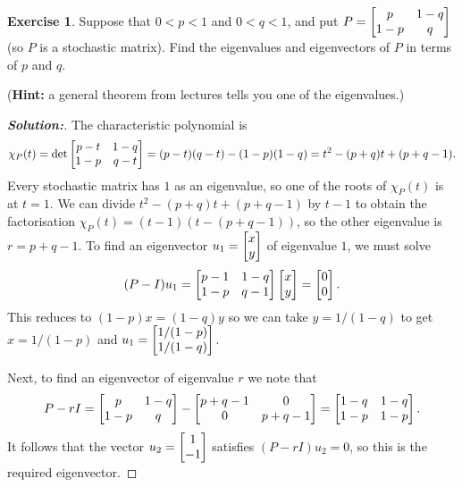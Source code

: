 \documentclass[a4paper]{amsart}
\theoremstyle{definition}
\newtheorem{exercise}{Exercise}
\newenvironment{solution}{\begin{proof}[\textbf{Solution:}] \vphantom{u}}{\end{proof}}
\begin{document}
\begin{exercise}\label{ex-stochastic-ii}
 Suppose that $0<p<1$ and $0<q<1$, and put $P=\left[\begin{matrix} p& 1-q \\ 1-p & q\end{matrix}\right]$ (so
 $P$ is a stochastic matrix).  Find the eigenvalues and eigenvectors
 of $P$ in terms of $p$ and $q$.  

 (\textbf{Hint:} a general theorem from lectures tells you one of the
 eigenvalues.) 
\end{exercise}
\begin{solution}
 The characteristic polynomial is
 \[ \chi_P(t) = \det\left[\begin{matrix} p-t & 1-q \\ 1-p & q-t \end{matrix}\right] =
     (p-t)(q-t)-(1-p)(1-q) = t^2-(p+q)t + (p+q-1).
 \]
 Every stochastic matrix has $1$ as an eigenvalue, so one of the roots
 of $\chi_P(t)$ is at $t=1$.  We can divide $t^2-(p+q)t + (p+q-1)$ by
 $t-1$ to obtain the factorisation $\chi_P(t)=(t-1)(t-(p+q-1))$, so
 the other eigenvalue is $r=p+q-1$.  To find an eigenvector
 $u_1=\left[\begin{matrix} x\\ y\end{matrix}\right]$ of eigenvalue $1$, we must solve 
 \[ (P-I)u_1 = \left[\begin{matrix} p-1 & 1-q \\ 1-p & q-1\end{matrix}\right] \left[\begin{matrix} x\\ y\end{matrix}\right] 
     = \left[\begin{matrix} 0\\ 0\end{matrix}\right].
 \]
 This reduces to $(1-p)x=(1-q)y$ so we can take $y=1/(1-q)$ to get
 $x=1/(1-p)$ and $u_1=\left[\begin{matrix} 1/(1-p)\\ 1/(1-q)\end{matrix}\right]$.

 Next, to find an eigenvector of eigenvalue $r$ we note that 
 \[ P-rI = \left[\begin{matrix} p & 1-q \\ 1-p & q \end{matrix}\right] -
           \left[\begin{matrix} p+q-1 & 0 \\ 0 & p+q-1 \end{matrix}\right] 
    = \left[\begin{matrix} 1-q & 1-q \\ 1-p & 1-p \end{matrix}\right].
 \]
 It follows that the vector $u_2=\left[\begin{matrix} 1\\ -1\end{matrix}\right]$ satisfies
 $(P-rI)u_2=0$, so this is the required eigenvector.
\end{solution}
\end{document}
